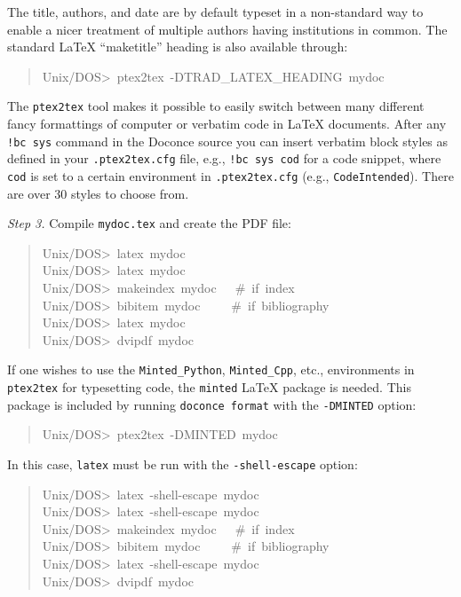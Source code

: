 \documentclass[a4paper,english]{article}
\begin{document}
The title, authors, and date are by default typeset in a non-standard
way to enable a nicer treatment of multiple authors having
institutions in common. The standard LaTeX ``maketitle'' heading
is also available through:
%
\begin{quote}{\ttfamily \raggedright \noindent
Unix/DOS>~ptex2tex~-DTRAD\_LATEX\_HEADING~mydoc
}
\end{quote}

The \texttt{ptex2tex} tool makes it possible to easily switch between many
different fancy formattings of computer or verbatim code in LaTeX
documents. After any \texttt{!bc sys} command in the Doconce source you can
insert verbatim block styles as defined in your \texttt{.ptex2tex.cfg}
file, e.g., \texttt{!bc sys cod} for a code snippet, where \texttt{cod} is set to
a certain environment in \texttt{.ptex2tex.cfg} (e.g., \texttt{CodeIntended}).
There are over 30 styles to choose from.

\emph{Step 3.} Compile \texttt{mydoc.tex}
and create the PDF file:
%
\begin{quote}{\ttfamily \raggedright \noindent
Unix/DOS>~latex~mydoc\\
Unix/DOS>~latex~mydoc\\
Unix/DOS>~makeindex~mydoc~~~\#~if~index\\
Unix/DOS>~bibitem~mydoc~~~~~\#~if~bibliography\\
Unix/DOS>~latex~mydoc\\
Unix/DOS>~dvipdf~mydoc
}
\end{quote}

If one wishes to use the \texttt{Minted\_Python}, \texttt{Minted\_Cpp}, etc., environments
in \texttt{ptex2tex} for typesetting code, the \texttt{minted} LaTeX package is needed.
This package is included by running \texttt{doconce format} with the
\texttt{-DMINTED} option:
%
\begin{quote}{\ttfamily \raggedright \noindent
Unix/DOS>~ptex2tex~-DMINTED~mydoc
}
\end{quote}

In this case, \texttt{latex} must be run with the
\texttt{-shell-escape} option:
%
\begin{quote}{\ttfamily \raggedright \noindent
Unix/DOS>~latex~-shell-escape~mydoc\\
Unix/DOS>~latex~-shell-escape~mydoc\\
Unix/DOS>~makeindex~mydoc~~~\#~if~index\\
Unix/DOS>~bibitem~mydoc~~~~~\#~if~bibliography\\
Unix/DOS>~latex~-shell-escape~mydoc\\
Unix/DOS>~dvipdf~mydoc
}
\end{quote}
\end{document}
